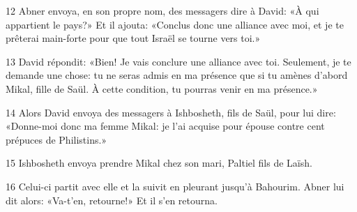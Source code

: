 
12 Abner envoya, en son propre nom, des messagers dire à David: «À qui appartient le pays?» Et il ajouta: «Conclus donc une alliance avec moi, et je te prêterai main-forte pour que tout Israël se tourne vers toi.»

13 David répondit: «Bien! Je vais conclure une alliance avec toi. Seulement, je te demande une chose: tu ne seras admis en ma présence que si tu amènes d’abord Mikal, fille de Saül. À cette condition, tu pourras venir en ma présence.»

14 Alors David envoya des messagers à Ishbosheth, fils de Saül, pour lui dire: «Donne-moi donc ma femme Mikal: je l’ai acquise pour épouse contre cent prépuces de Philistins.»

15 Ishbosheth envoya prendre Mikal chez son mari, Paltiel fils de Laïsh.

16 Celui-ci partit avec elle et la suivit en pleurant jusqu’à Bahourim. Abner lui dit alors: «Va-t’en, retourne!» Et il s’en retourna.
